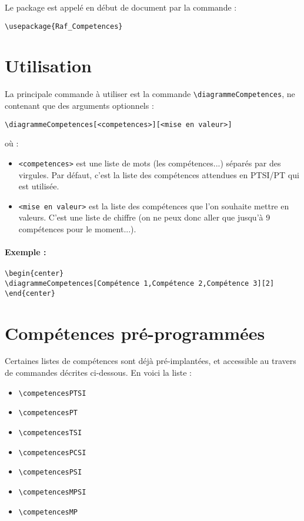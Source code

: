 \documentclass[a4paper,12pt]{article}
\begin{document}
		Le package est appelé en début de document par la commande :
		\begin{verbatim}
\usepackage{Raf_Competences}
		\end{verbatim}

	\section{Utilisation}
	
	La principale commande à utiliser est la commande \verb!\diagrammeCompetences!, ne contenant que des arguments optionnels :
	\begin{center}
		\verb!\diagrammeCompetences[<competences>][<mise en valeur>]!
	\end{center}
	où :
	\begin{itemize}
		\item\verb!<competences>! est une liste de mots (les compétences...) séparés par des virgules.
					Par défaut, c'est la liste des compétences attendues en PTSI/PT qui est utilisée.
		\item\verb!<mise en valeur>! est la liste des compétences que l'on souhaite mettre en valeurs. C'est une liste de chiffre (on ne peux donc aller que jusqu'à 9 compétences pour le moment...).
	\end{itemize}
	
	\paragraph{Exemple :}
	\begin{verbatim}
\begin{center}
\diagrammeCompetences[Compétence 1,Compétence 2,Compétence 3][2]
\end{center}
	\end{verbatim}

\begin{center}
\end{center}

	\section{Compétences pré-programmées}
	
		Certaines listes de compétences sont déjà pré-implantées, et accessible au travers de commandes décrites ci-dessous. En voici la liste :
		\begin{itemize}
			\item \verb!\competencesPTSI!
			\item \verb!\competencesPT!
			\item \verb!\competencesTSI!
			\item \verb!\competencesPCSI!
			\item \verb!\competencesPSI!
			\item \verb!\competencesMPSI!
			\item \verb!\competencesMP!
		\end{itemize}
\end{document}
